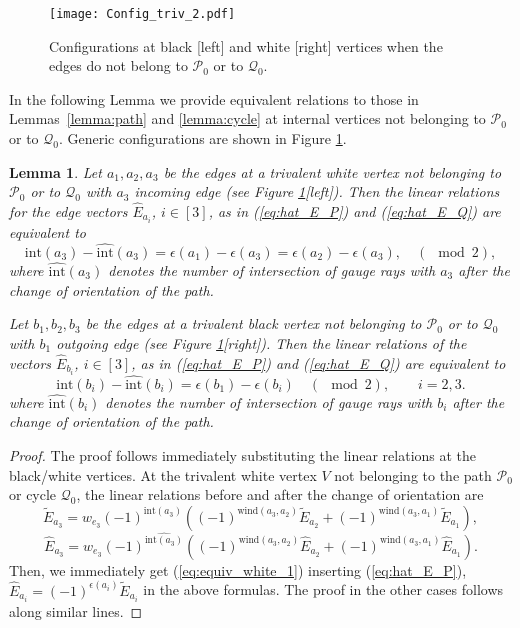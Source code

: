 \documentclass[11pt]{amsart}
\theoremstyle{plain}
\numberwithin{equation}{section}
\newtheorem{lemma}[theorem]{Lemma}
\begin{document}
\begin{figure}
  \centering
  {\texttt{[image: Config\_triv\_2.pdf]}}
	\vspace{-2.3 truecm}
  \caption{Configurations at black [left] and white [right] vertices when the edges do not belong to $\mathcal P_0$ or to $\mathcal Q_0$.}
	\label{fig:config_triv1}
\end{figure}

In the following Lemma we provide equivalent relations to those in Lemmas~\ref{lemma:path} and \ref{lemma:cycle} at internal vertices not belonging to $\mathcal P_0$ or to $\mathcal Q_0$. Generic configurations are shown in Figure \ref{fig:config_triv1}. 

\begin{lemma}
\label{lemma:equiv_rel_1} 
Let $a_1,a_2,a_3$ be the edges at a trivalent white vertex not belonging to $\mathcal P_0$ or to $\mathcal Q_0$ with $a_3$ incoming edge (see Figure \ref{fig:config_triv1}[left]). Then the linear relations for the edge vectors ${\hat E}_{a_i}$, $i\in [3]$, as in (\ref{eq:hat_E_P}) and (\ref{eq:hat_E_Q}) are equivalent to 
\begin{equation}
\label{eq:equiv_white_1}
\mbox{int}(a_3) - \widehat{\mbox{int}}(a_3) = \epsilon(a_1) -\epsilon(a_3) = \epsilon(a_2) -\epsilon(a_3), \quad (\!\!\!\!\!\!\mod 2),
\end{equation}
where $\widehat{\mbox{int}}(a_3)$ denotes the number of intersection of gauge rays with $a_3$ after the change of orientation of the path.

Let $b_1,b_2,b_3$ be the edges at a trivalent black vertex not belonging to $\mathcal P_0$ or to $\mathcal Q_0$ with $b_1$ outgoing edge (see Figure \ref{fig:config_triv1}[right]). Then the linear relations of the vectors ${\hat E}_{b_i}$, $i\in [3]$, as in (\ref{eq:hat_E_P}) and (\ref{eq:hat_E_Q}) are equivalent to 
\begin{equation}
\label{eq:equiv_black_1}
\mbox{int}(b_i) - \widehat{\mbox{int}}(b_i) = \epsilon(b_1) -\epsilon(b_i)  \quad (\!\!\!\!\!\!\mod 2), \quad\quad i=2,3.
\end{equation}
where $\widehat{\mbox{int}}(b_i)$ denotes the number of intersection of gauge rays with $b_i$ after the change of orientation of the path.
\end{lemma}

\begin{proof}
The proof follows immediately substituting the linear relations at the black/white vertices. At the trivalent white vertex $V$  not belonging to the path ${\mathcal P}_0$ or cycle $\mathcal Q_0$, the linear relations before and after the change of orientation are
\[
{\tilde E}_{a_3} = w_{e_3} (-1)^{\mbox{int}(a_3)} \left( (-1)^{\mbox{wind}(a_3,a_2)}{\tilde E}_{a_2}  +  (-1)^{\mbox{wind}(a_3,a_1)}{\tilde E}_{a_1}\right), 
\]
\[
{\hat E}_{a_3} = w_{e_3} (-1)^{\widehat{\mbox{int}(a_3)}} \left( (-1)^{\mbox{wind}(a_3,a_2)}{\hat E}_{a_2}  +  (-1)^{\mbox{wind}(a_3,a_1)}{\hat E}_{a_1}\right).
\] 
Then, we immediately get (\ref{eq:equiv_white_1}) inserting (\ref{eq:hat_E_P}), ${\hat E}_{a_i} = (-1)^{\epsilon(a_i)} {\tilde E}_{a_i}$  in the above formulas. The proof in the other cases follows along similar lines.
\end{proof}
\end{document}
